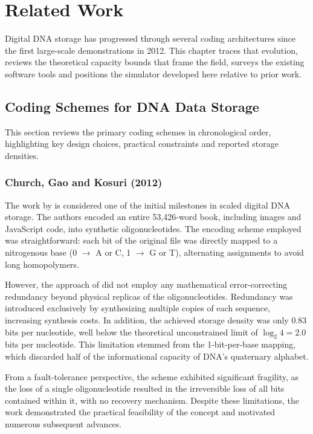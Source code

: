 \chapter{Related Work}
\label{chap:related_work}

Digital DNA storage has progressed through several coding architectures since the first large-scale demonstrations in 2012. This chapter traces that evolution, reviews the theoretical capacity bounds that frame the field, surveys the existing software tools and positions the simulator developed here relative to prior work.

\section{Coding Schemes for DNA Data Storage}
\label{sec:related_dna_encoding}

This section reviews the primary coding schemes in chronological order, highlighting key design choices, practical constraints and reported storage densities.

\subsection{Church, Gao and Kosuri (2012)}

The work by  is considered one of the initial milestones in scaled digital DNA storage. The authors encoded an entire 53,426-word book, including images and JavaScript code, into synthetic oligonucleotides. The encoding scheme employed was straightforward: each bit of the original file was directly mapped to a nitrogenous base (0 $\rightarrow$ A or C, 1 $\rightarrow$ G or T), alternating assignments to avoid long homopolymers.

However, the approach of  did not employ any mathematical error-correcting redundancy beyond physical replicas of the oligonucleotides. Redundancy was introduced exclusively by synthesizing multiple copies of each sequence, increasing synthesis costs. In addition, the achieved storage density was only 0.83 bits per nucleotide, well below the theoretical unconstrained limit of $\log_2 4 = 2.0$ bits per nucleotide. This limitation stemmed from the 1-bit-per-base mapping, which discarded half of the informational capacity of DNA's quaternary alphabet.

From a fault-tolerance perspective, the scheme exhibited significant fragility, as the loss of a single oligonucleotide resulted in the irreversible loss of all bits contained within it, with no recovery mechanism. Despite these limitations, the work demonstrated the practical feasibility of the concept and motivated numerous subsequent advances.

